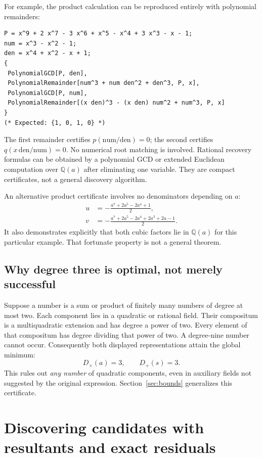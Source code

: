 \documentclass[11pt,a4paper]{article}
\theoremstyle{definition}\newtheorem{definition}[theorem]{Definition}
\theoremstyle{remark}\newtheorem{remark}[theorem]{Remark}
\newcommand{\Q}{\mathbb Q}
\newcommand{\Dplus}{D_{+}}
\newcommand{\Dtimes}{D_{\times}}
\begin{document}
For example, the product calculation can be reproduced entirely with
polynomial remainders:
\begin{lstlisting}
P = x^9 + 2 x^7 - 3 x^6 + x^5 - x^4 + 3 x^3 - x - 1;
num = x^3 - x^2 - 1;
den = x^4 + x^2 - x + 1;
{
 PolynomialGCD[P, den],
 PolynomialRemainder[num^3 + num den^2 + den^3, P, x],
 PolynomialGCD[P, num],
 PolynomialRemainder[(x den)^3 - (x den) num^2 + num^3, P, x]
}
(* Expected: {1, 0, 1, 0} *)
\end{lstlisting}
The first remainder certifies $p(\mathrm{num}/\mathrm{den})=0$; the second
certifies $q(x\,\mathrm{den}/\mathrm{num})=0$. No numerical root matching is
involved. Rational recovery formulas can be obtained by a polynomial GCD or
extended Euclidean computation over $\Q(a)$ after eliminating one variable.
They are compact certificates, not a general discovery algorithm.

An alternative product certificate involves no denominators depending on
$a$:
\begin{align*}
 u&=-\frac{a^7+2a^5-2a^4+1}{2},\\
 v&=-\frac{a^7+2a^5-2a^4+2a^3+2a-1}{2}.
\end{align*}
It also demonstrates explicitly that both cubic factors lie in $\Q(a)$ for
this particular example. That fortunate property is not a general theorem.

\subsection{Why degree three is optimal, not merely successful}

Suppose a number is a sum or product of finitely many numbers of degree at
most two. Each component lies in a quadratic or rational field. Their
compositum is a multiquadratic extension and has degree a power of two.
Every element of that compositum has degree dividing that power of two.
A degree-nine number cannot occur. Consequently both displayed
representations attain the global minimum:
\[
 \boxed{\Dtimes(a)=3,\qquad \Dplus(s)=3.}
\]
This rules out \emph{any number} of quadratic components, even in auxiliary
fields not suggested by the original expression. Section~\ref{sec:bounds}
generalizes this certificate.

\section{Discovering candidates with resultants and exact residuals}
\label{sec:discovery}
\end{document}
